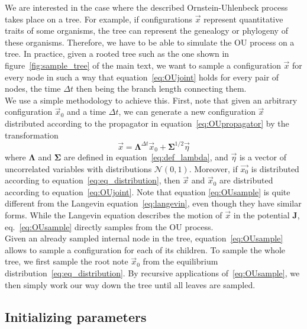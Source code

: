 \documentclass[preprint,amsmath,amssymb,superscriptaddress,showpacs,pre]{revtex4-1}
\def\vx{\vec x}
\newcommand{\Lam}{\bm{\Lambda}}
\newcommand{\Sig}{\bm{\Sigma}}
\begin{document}
	We are interested in the case where the described Ornstein-Uhlenbeck process takes place on a tree. 
	For example, if configurations $\vec{x}$ represent quantitative traits of some organisms, the tree can represent the genealogy or phylogeny of these organisms. 
	Therefore, we have to be able to simulate the OU process on a tree. 
	In practice, given a rooted tree such as the one shown in figure~\ref{fig:sample_tree} of the main text, we want to sample a configuration $\vec{x}$ for every node in such a way that equation~\eqref{eq:OUjoint} holds for every pair of nodes, the time $\Delta t$ then being the branch length connecting them. \\
	We use a simple methodology to achieve this. 
	First, note that given an arbitrary configuration $\vec{x}_0$ and a time $\Delta t$, we can generate a new configuration $\vec{x}$ distributed according to the propagator in equation~\eqref{eq:OUpropagator} by the transformation
	\begin{equation}
		\vx = \Lam^{\Delta t}\vx_0 + \Sig^{1/2}\vec{\eta}
		\label{eq:OUsample}
	\end{equation}
	where $\Lam$ and $\Sig$ are defined in equation~\eqref{eq:def_lambda}, and $\vec{\eta}$ is a vector of uncorrelated variables with distributions $\mathcal{N}(0,1)$. 
	Moreover, if $\vec{x_0}$ is distributed according to equation~\eqref{eq:eq_distribution}, then $\vx$ and $\vx_0$ are distributed according to equation~\eqref{eq:OUjoint}. 
	Note that equation \eqref{eq:OUsample} is quite different from the Langevin equation~\eqref{eq:langevin}, even though they have similar forms. 
	While the Langevin equation describes the motion of $\vx$ in the potential $\bm{J}$, eq.~\eqref{eq:OUsample} directly samples from the OU process. \\
	Given an already sampled internal node in the tree, equation~\eqref{eq:OUsample} allows to sample a configuration for each of its children. 
	To sample the whole tree, we first sample the root note $\vx_0$ from the equilibrium distribution~\eqref{eq:eq_distribution}. 
	By recursive applications of~\eqref{eq:OUsample}, we then simply work our way down the tree until all leaves are sampled.  



\subsection{Initializing parameters} %
\label{sub:initializing_parameters}
\end{document}
